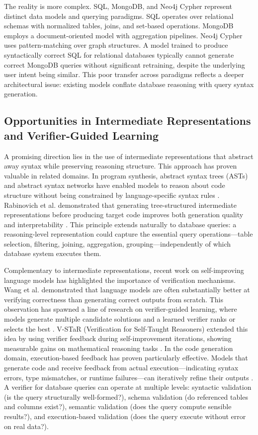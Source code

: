 \documentclass[conference]{IEEEtran}
\begin{document}
The reality is more complex. SQL, MongoDB, and Neo4j Cypher represent distinct data models and querying paradigms. SQL operates over relational schemas with normalized tables, joins, and set-based operations. MongoDB employs a document-oriented model with aggregation pipelines. Neo4j Cypher uses pattern-matching over graph structures. A model trained to produce syntactically correct SQL for relational databases typically cannot generate correct MongoDB queries without significant retraining, despite the underlying user intent being similar. This poor transfer across paradigms reflects a deeper architectural issue: existing models conflate database reasoning with query syntax generation.

\subsection{Opportunities in Intermediate Representations and Verifier-Guided Learning}

A promising direction lies in the use of intermediate representations that abstract away syntax while preserving reasoning structure. This approach has proven valuable in related domains. In program synthesis, abstract syntax trees (ASTs) and abstract syntax networks have enabled models to reason about code structure without being constrained by language-specific syntax rules \cite{b11, b12}. Rabinovich et al. demonstrated that generating tree-structured intermediate representations before producing target code improves both generation quality and interpretability \cite{b12}. This principle extends naturally to database queries: a reasoning-level representation could capture the essential query operations—table selection, filtering, joining, aggregation, grouping—independently of which database system executes them.

Complementary to intermediate representations, recent work on self-improving language models has highlighted the importance of verification mechanisms. Wang et al. \cite{b13} demonstrated that language models are often substantially better at verifying correctness than generating correct outputs from scratch. This observation has spawned a line of research on verifier-guided learning, where models generate multiple candidate solutions and a learned verifier ranks or selects the best \cite{b14, b15}. V-STaR (Verification for Self-Taught Reasoners) extended this idea by using verifier feedback during self-improvement iterations, showing measurable gains on mathematical reasoning tasks \cite{b16}. In the code generation domain, execution-based feedback has proven particularly effective. Models that generate code and receive feedback from actual execution—indicating syntax errors, type mismatches, or runtime failures—can iteratively refine their outputs \cite{b17, b18}. A verifier for database queries can operate at multiple levels: syntactic validation (is the query structurally well-formed?), schema validation (do referenced tables and columns exist?), semantic validation (does the query compute sensible results?), and execution-based validation (does the query execute without error on real data?).
\end{document}
